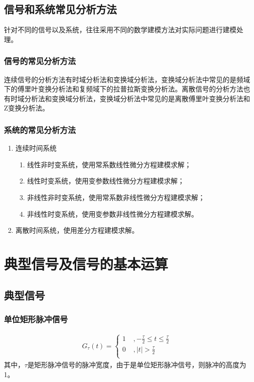 \documentclass{hitreport}
\begin{document}
\subsection{信号和系统常见分析方法}

针对不同的信号以及系统，往往采用不同的数学建模方法对实际问题进行建模处理。

\subsubsection{信号的常见分析方法}

连续信号的分析方法有时域分析法和变换域分析法，变换域分析法中常见的是频域下的傅里叶变换分析法和复频域下的拉普拉斯变换分析法。离散信号的分析方法也有时域分析法和变换域分析法，变换域分析法中常见的是离散傅里叶变换分析法和Z变换分析法。

\subsubsection{系统的常见分析方法}
\begin{enumerate}
\item 连续时间系统
\begin{enumerate}
\item 线性非时变系统，使用常系数线性微分方程建模求解；
\item 线性时变系统，使用变参数线性微分方程建模求解；
\item 非线性非时变系统，使用常系数非线性微分方程建模求解；
\item 非线性时变系统，使用变参数非线性微分方程建模求解。
\end{enumerate}
\item 离散时间系统，使用差分方程建模求解。
\end{enumerate}


\section{典型信号及信号的基本运算}

\subsection{典型信号}

\subsubsection{单位矩形脉冲信号}
	\begin{align}\label{equ:Gtaut}
	G_{\tau}\left( t \right) =\left\{ \begin{array}{l}
	1 \ \ \ \ \ ,-\frac{\tau}{2}\le t\le \frac{\tau}{2}\\
	0 \ \ \ \ \ ,\left| t \right|>\frac{\tau}{2}\\
	\end{array} \right.
	\end{align}
其中，$\tau$是矩形脉冲信号的脉冲宽度，由于是单位矩形脉冲信号，则脉冲的高度为1。
\end{document}
